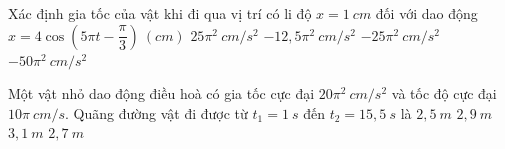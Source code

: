 \begin{ex}
Xác định gia tốc của vật khi đi qua vị trí có li độ $x = 1\ cm$ đối với dao động $x = 4\cos\left(5\pi t - \dfrac{\pi}{3}\right)\ (cm)$  
\choice
{$25\pi^{2}\ cm/s^{2}$}
{$-12,5\pi^{2}\ cm/s^{2}$}
{\True $-25\pi^{2}\ cm/s^{2}$}
{$-50\pi^{2}\ cm/s^{2}$}	
\loigiai{
}
\end{ex}
\begin{ex}
Một vật nhỏ dao động điều hoà có gia tốc cực đại $20\pi^{2}\ cm/s^{2}$ và tốc độ cực đại $10\pi\ cm/s$.  
Quãng đường vật đi được từ $t_1 = 1\ s$ đến $t_2 = 15,5\ s$ là
\choice
{$2,5\ m$}
{\True $2,9\ m$}
{$3,1\ m$}
{$2,7\ m$}
\end{ex}

